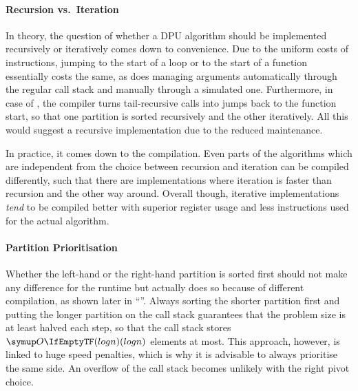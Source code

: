 \paragraph{Recursion vs.\ Iteration}
In theory, the question of whether a DPU algorithm should be implemented recursively or iteratively comes down to convenience.
Due to the uniform costs of instructions, jumping to the start of a loop or to the start of a function essentially costs the same, as does managing arguments automatically through the regular call stack and manually through a simulated one.
Furthermore, in case of \QS{}, the compiler turns tail-recursive calls into jumps back to the function start, so that one partition is sorted recursively and the other iteratively.
All this would suggest a recursive implementation due to the reduced maintenance.

In practice, it comes down to the compilation.
Even parts of the algorithms which are independent from the choice between recursion and iteration can be compiled differently, such that there are implementations where iteration is faster than recursion and the other way around.
Overall though, iterative implementations \emph{tend} to be compiled better with superior register usage and less instructions used for the actual \QS{} algorithm.


\paragraph{Partition Prioritisation}
Whether the left-hand or the right-hand partition is sorted first should not make any difference for the runtime but actually does so because of different compilation, as shown later in \enquote{}.
Always sorting the shorter partition first and putting the longer partition on the call stack guarantees that the problem size is at least halved each step, so that the call stack stores \(\bigoh{log n}\) elements at most.
This approach, however, is linked to huge speed penalties, which is why it is advisable to always prioritise the same side.
An overflow of the call stack becomes unlikely with the right pivot choice.


